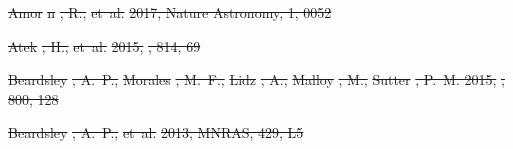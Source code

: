 \documentclass[numberedappendix]{emulateapj}
\providecommand{\DIFdel}[1]{{\protect\color{red}\sout{#1}}}                      %
\begin{document}
\DIFdel{Amor}%
\DIFdel{n}%
\DIFdel{, R., }%
\DIFdel{et~al.}%
\DIFdel{2017, Nature Astronomy, 1, 0052
}%

\DIFdel{Atek}%
\DIFdel{, H., }%
\DIFdel{et~al.}%
\DIFdel{2015, }%
\DIFdel{, 814, 69
}%

\DIFdel{Beardsley}%
\DIFdel{, A.~P., }%
\DIFdel{Morales}%
\DIFdel{, M.~F., }%
\DIFdel{Lidz}%
\DIFdel{, A., }%
\DIFdel{Malloy}%
\DIFdel{, M., }%
\DIFdel{Sutter}%
\DIFdel{,
  P.~M. 2015, }%
\DIFdel{, 800, 128
}%

\DIFdel{Beardsley}%
\DIFdel{, A.~P., }%
\DIFdel{et~al.}%
\DIFdel{2013, MNRAS, 429, L5
}%
\end{document}
